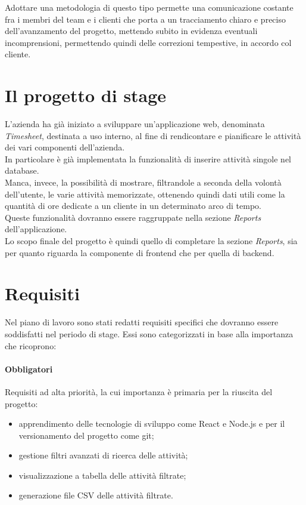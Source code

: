 \noindent Adottare una metodologia di questo tipo permette una comunicazione costante fra i membri del team e i clienti che porta a un tracciamento chiaro e preciso dell'avanzamento del progetto, mettendo subito in evidenza eventuali incomprensioni, permettendo quindi delle correzioni tempestive, in accordo col cliente.

\section{Il progetto di stage}
\label{sec:progettostage}
L'azienda ha già iniziato a sviluppare un'applicazione web, denominata \emph{Timesheet}, destinata a uso interno, al fine di rendicontare e pianificare le attività dei vari componenti dell'azienda. \\
In particolare è già implementata la funzionalità di inserire attività singole nel database. \\
Manca, invece, la possibilità di mostrare, filtrandole a seconda della volontà dell'utente, le varie attività memorizzate, ottenendo quindi dati utili come la quantità di ore dedicate a un cliente in un determinato arco di tempo. \\
Queste funzionalità dovranno essere raggruppate nella sezione \emph{Reports} dell'applicazione. \\
Lo scopo finale del progetto è quindi quello di completare la sezione \emph{Reports}, sia per quanto riguarda la componente di frontend che per quella di backend.

\section{Requisiti}
\label{sec:requisiti}
Nel piano di lavoro sono stati redatti requisiti specifici che dovranno essere soddisfatti nel periodo di stage. Essi sono categorizzati in base alla importanza che ricoprono:


\paragraph{Obbligatori} Requisiti ad alta priorità, la cui importanza è primaria per la riuscita del progetto:

\begin{itemize}
  \item apprendimento delle tecnologie di sviluppo come React e Node.js e per il versionamento del progetto come git;
  \item gestione filtri avanzati di ricerca delle attività;
  \item visualizzazione a tabella delle attività filtrate;
  \item generazione file CSV delle attività filtrate.
\end{itemize}

